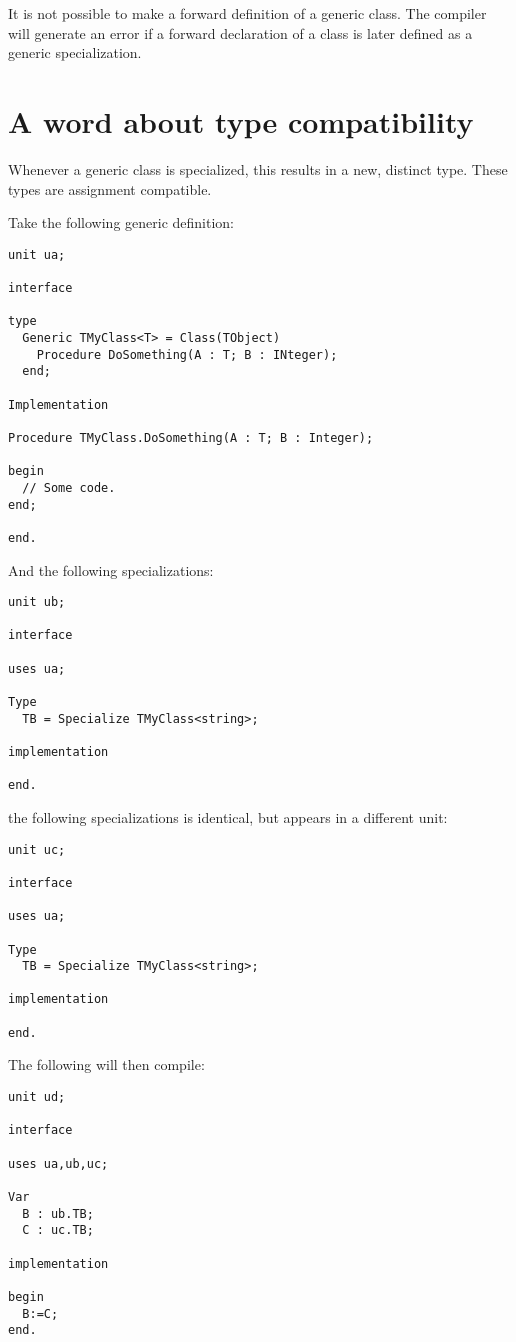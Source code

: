 \begin{remark}
It is not possible to make a forward definition of a generic class. The
compiler will generate an error if a forward declaration of a class is
later defined as a generic specialization.
\end{remark}

\section{A word about type compatibility}
Whenever a generic class is specialized, this results in a new, distinct type.
These types are assignment compatible.

Take the following generic definition:
\begin{verbatim}
unit ua;

interface

type 
  Generic TMyClass<T> = Class(TObject)
    Procedure DoSomething(A : T; B : INteger);
  end;
      
Implementation

Procedure TMyClass.DoSomething(A : T; B : Integer);
          
begin
  // Some code.
end;
              
end.
\end{verbatim}
And the following specializations:
\begin{verbatim}
unit ub;

interface

uses ua;

Type
  TB = Specialize TMyClass<string>;

implementation

end.
\end{verbatim}
the following specializations is identical, but appears in a different unit:
\begin{verbatim}
unit uc;

interface

uses ua;

Type
  TB = Specialize TMyClass<string>;

implementation

end.
\end{verbatim}
The following will then compile:
\begin{verbatim}
unit ud;

interface

uses ua,ub,uc;

Var
  B : ub.TB;
  C : uc.TB;
  
implementation

begin
  B:=C;
end.
\end{verbatim}
